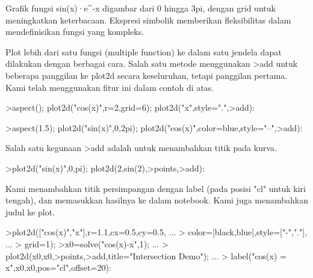 \documentclass{article}
\begin{document}
\begin{eulernotebook}
\begin{eulercomment}
\begin{eulercomment}
\begin{eulercomment}
\begin{eulercomment}
\begin{eulercomment}
\begin{eulercomment}
\begin{eulercomment}
\begin{eulercomment}
\begin{eulercomment}
\begin{eulercomment}
\begin{eulercomment}
Grafik fungsi sin(x)·e\textasciicircum{}-x digambar dari 0 hingga 3pi, dengan grid
untuk meningkatkan keterbacaan. Ekspresi simbolik memberikan
fleksibilitas dalam mendefinisikan fungsi yang kompleks.\\
\end{eulercomment}
\eulersubheading{}
\begin{eulercomment}
\begin{eulercomment}
\begin{eulercomment}
Plot lebih dari satu fungsi (multiple function) ke dalam satu jendela
dapat dilakukan dengan berbagai cara. Salah satu metode menggunakan
\textgreater{}add untuk beberapa panggilan ke plot2d secara keseluruhan, tetapi
panggilan pertama. Kami telah menggunakan fitur ini dalam contoh di
atas.
\end{eulercomment}
\begin{eulerprompt}
>aspect(); plot2d("cos(x)",r=2,grid=6); plot2d("x",style=".",>add):
\end{eulerprompt}
\begin{eulerprompt}
>aspect(1.5); plot2d("sin(x)",0,2pi); plot2d("cos(x)",color=blue,style="--",>add):
\end{eulerprompt}
\begin{eulercomment}
Salah satu kegunaan \textgreater{}add adalah untuk menambahkan titik pada kurva.
\end{eulercomment}
\begin{eulerprompt}
>plot2d("sin(x)",0,pi); plot2d(2,sin(2),>points,>add):
\end{eulerprompt}
\begin{eulercomment}
Kami menambahkan titik persimpangan dengan label (pada posisi "cl"
untuk kiri tengah), dan memasukkan hasilnya ke dalam notebook. Kami
juga menambahkan judul ke plot.
\end{eulercomment}
\begin{eulerprompt}
>plot2d(["cos(x)","x"],r=1.1,cx=0.5,cy=0.5, ...
>  color=[black,blue],style=["-","."], ...
>  grid=1);
>x0=solve("cos(x)-x",1);  ...
>  plot2d(x0,x0,>points,>add,title="Intersection Demo");  ...
>  label("cos(x) = x",x0,x0,pos="cl",offset=20):
\end{eulerprompt}

\end{eulercomment}
\end{eulercomment}
\end{eulercomment}
\end{eulercomment}
\end{eulercomment}
\end{eulercomment}
\end{eulercomment}
\end{eulercomment}
\end{eulercomment}
\end{eulercomment}
\end{eulercomment}
\end{eulercomment}
\end{eulernotebook}
\end{document}
